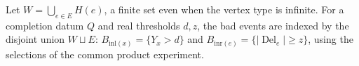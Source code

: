 \begin{definition}
Let $W=\bigcup_{e\in E}H(e)$, a finite set even when the vertex type is
infinite. For a completion datum $Q$ and real thresholds $d,z$, the bad
events are indexed by the disjoint union $W\sqcup E$:
$B_{\mathrm{inl}(x)}=\{Y_x>d\}$ and
$B_{\mathrm{inr}(e)}=\{|\operatorname{Del}_e|\ge z\}$, using the selections
of the common product experiment.
\end{definition}
